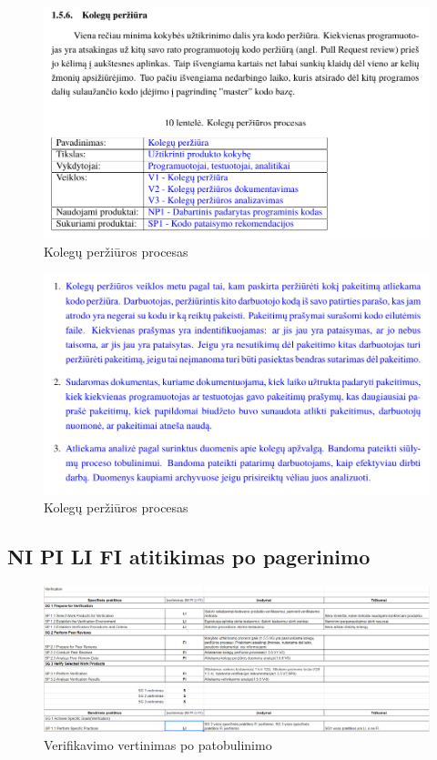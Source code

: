 \documentclass{VUMIFPSkursinis}
\begin{document}
				\begin{figure}[!htbp]
					\includegraphics[scale=0.8]{img/kolegupoone}
					\caption{Kolegų peržiūros procesas} %
					\label{img:ProfilisPo}
				\end{figure}
				\begin{figure}[!htbp]
					\includegraphics[scale=0.8]{img/kolegupotwo}
					\caption{Kolegų peržiūros procesas} %
					\label{img:ProfilisPo}
				\end{figure}

		\subsection{NI PI LI FI atitikimas po pagerinimo}
\pagebreak
				\begin{figure}[!htbp]
					\includegraphics[scale=0.4]{img/verfpo}
					\caption{Verifikavimo vertinimas po patobulinimo} %
					\label{img:ProfilisPo}
				\end{figure}
\end{document}
